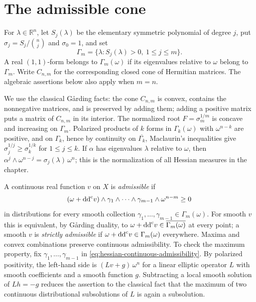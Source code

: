 \section{The admissible cone}
\label{sec:hessian-cone}

For $\lambda\in\mathbb R^n$, let $S_j(\lambda)$ be the elementary
symmetric polynomial of degree $j$, put $\sigma_j=S_j/\binom nj$ and
$\sigma_0=1$, and set
\[
 \Gamma_m=\{\lambda:S_j(\lambda)>0,\ 1\leq j\leq m\}.
\]
A real $(1,1)$-form belongs to $\Gamma_m(\omega)$ if its eigenvalues
relative to $\omega$ belong to $\Gamma_m$. Write $C_{n,m}$ for the
corresponding closed cone of Hermitian matrices. The algebraic assertions
below also apply when $m=n$.

We use the classical G\aa rding facts: the cone $C_{n,m}$ is convex,
contains the nonnegative matrices, and is preserved by adding them;
adding a positive matrix puts a matrix of $C_{n,m}$ in its interior.
The normalized root $F=\sigma_m^{1/m}$ is concave and increasing on
$\Gamma_m$. Polarized products of $k$ forms in $\Gamma_k(\omega)$ with
$\omega^{n-k}$ are positive, and on $\Gamma_k$, hence by continuity on $\overline{\Gamma_k}$, Maclaurin's inequalities
give $\sigma_j^{1/j}\geq\sigma_k^{1/k}$ for $1\leq j\leq k$. If $\alpha$
has eigenvalues $\lambda$ relative to $\omega$, then
$\alpha^j\wedge\omega^{n-j}=\sigma_j(\lambda)\,\omega^n$; this is the
normalization of all Hessian measures in the chapter.

A continuous real function $v$ on $X$ is \emph{admissible} if
\begin{equation}\label{eq:hessian-continuous-admissibility}
 (\omega+\mathrm{dd}^{\mathrm{c}} v)\wedge\gamma_1\wedge\cdots\wedge\gamma_{m-1}
                                  \wedge\omega^{n-m}\geq0
\end{equation}
in distributions for every smooth collection
$\gamma_1,\ldots,\gamma_{m-1}\in\Gamma_m(\omega)$.
For smooth $v$ this is equivalent, by G\aa rding duality, to
$\omega+\mathrm{dd}^{\mathrm{c}} v\in\overline{\Gamma_m(\omega)}$ at every point; a smooth
$v$ is \emph{strictly admissible} if $\omega+\mathrm{dd}^{\mathrm{c}} v\in\Gamma_m(\omega)$
everywhere. Maxima and convex combinations preserve continuous
admissibility. To check the maximum property, fix
$\gamma_1,\ldots,\gamma_{m-1}$ in
\eqref{eq:hessian-continuous-admissibility}. By polarized positivity,
the left-hand side is $(Lv+g)\,\omega^n$ for a linear elliptic operator
$L$ with smooth coefficients and a smooth function $g$. Subtracting a
local smooth solution of $Lh=-g$ reduces the assertion to the classical
fact that the maximum of two continuous distributional subsolutions of
$L$ is again a subsolution.

